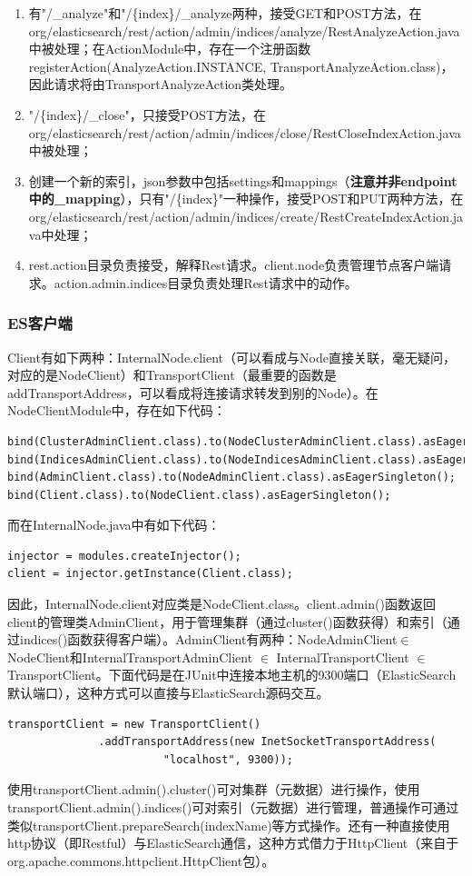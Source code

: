 \begin{enumerate}[(1)]
\item 有"/\_analyze"和"/\{index\}/\_analyze两种，接受GET和POST方法，在org/elasticsearch/rest/action/admin/indices/analyze/RestAnalyzeAction.java中被处理；在ActionModule中，存在一个注册函数registerAction(AnalyzeAction.INSTANCE, TransportAnalyzeAction.class)，因此请求将由TransportAnalyzeAction类处理。
\item "/\{index\}/\_close"，只接受POST方法，在org/elasticsearch/rest/action/admin/indices/close/RestCloseIndexAction.java中被处理；
\item  创建一个新的索引，json参数中包括settings和mappings（\textbf{注意并非endpoint中的\_mapping}），只有"/\{index\}"一种操作，接受POST和PUT两种方法，在org/elasticsearch/rest/action/admin/indices/create/RestCreateIndexAction.java中处理；
\item rest.action目录负责接受，解释Rest请求。client.node负责管理节点客户端请求。action.admin.indices目录负责处理Rest请求中的动作。
\end{enumerate}
\subsubsection{ES客户端}
Client有如下两种：InternalNode.client（可以看成与Node直接关联，毫无疑问，对应的是NodeClient）和TransportClient（最重要的函数是addTransportAddress，可以看成将连接请求转发到别的Node）。在NodeClientModule中，存在如下代码：
\begin{small}
\begin{verbatim}
bind(ClusterAdminClient.class).to(NodeClusterAdminClient.class).asEagerSingleton();
bind(IndicesAdminClient.class).to(NodeIndicesAdminClient.class).asEagerSingleton();
bind(AdminClient.class).to(NodeAdminClient.class).asEagerSingleton();
bind(Client.class).to(NodeClient.class).asEagerSingleton();
\end{verbatim}
\end{small}
而在InternalNode.java中有如下代码：
\begin{verbatim}
injector = modules.createInjector();
client = injector.getInstance(Client.class);
\end{verbatim}
\par 因此，InternalNode.client对应类是NodeClient.class。client.admin()函数返回client的管理类AdminClient，用于管理集群（通过cluster()函数获得）和索引（通过indices()函数获得客户端）。AdminClient有两种：NodeAdminClient$\in$NodeClient和InternalTransportAdminClient $\in$ InternalTransportClient $\in$ TransportClient。下面代码是在JUnit中连接本地主机的9300端口（ElasticSearch默认端口），这种方式可以直接与ElasticSearch源码交互。
\begin{verbatim}
transportClient = new TransportClient()
              .addTransportAddress(new InetSocketTransportAddress(
						"localhost", 9300));
\end{verbatim}
使用transportClient.admin().cluster()可对集群（元数据）进行操作，使用transportClient.admin().indices()可对索引（元数据）进行管理，普通操作可通过类似transportClient.prepareSearch(indexName)等方式操作。还有一种直接使用http协议（即Restful）与ElasticSearch通信，这种方式借力于HttpClient（来自于org.apache.commons.httpclient.HttpClient包）。
